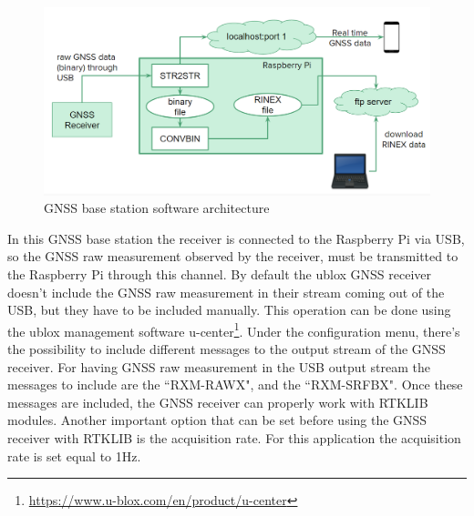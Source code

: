 \begin{figure}[H] 
	\centering
	\includegraphics[scale=0.60]{fig/lige_sw_architecture.PNG} 
	\caption{GNSS base station software architecture}
	\label{FIG:ligesw} 
\end{figure}

In this GNSS base station the receiver is connected to the Raspberry Pi via USB, so the GNSS raw measurement observed by the receiver, must be transmitted to the Raspberry Pi through this channel.
By default the ublox GNSS receiver doesn't include the GNSS raw measurement in their stream coming out of the USB, but they have to be included manually. This operation can be done using the ublox management software u-center\footnote{\url{https://www.u-blox.com/en/product/u-center}}. Under the configuration menu, there's the possibility to include different messages to the output stream of the GNSS receiver. For having GNSS raw measurement in the USB output stream the messages to include are the ``RXM-RAWX", and the ``RXM-SRFBX". Once these messages are included, the GNSS receiver can properly work with RTKLIB modules. Another important option that can be set before using the GNSS receiver with RTKLIB is the acquisition rate. For this application the acquisition rate is set equal to 1Hz.

